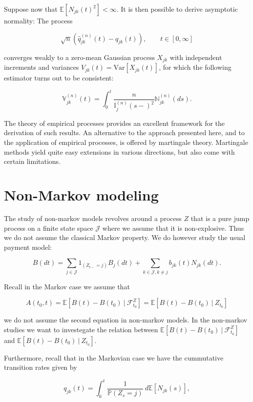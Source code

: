 \documentclass[a4paper,10pt,openany]{book}
\begin{document}
Suppose now that \(\mathbb E[N_{jk}(t)^2] < \infty\). It is then possible to derive asymptotic normality: The process

\[
\sqrt{n}\left(\hat q_{jk}^{(n)}(t)-q_{jk}(t)\right),\qquad t\in [0,\infty]
\]

converges weakly to a zero-mean Gaussian process \(X_{jk}\) with independent increments and variances \(V_{jk}(t) = \text{Var}[X_{jk}(t)]\), for which the following estimator turns out to be consistent:

\[
\mathbb V_{jk}^{(n)}(t)=\int_0^t\frac{n}{\mathbb I_{j}^{(n)}(s-)^2}\mathbb N^{(n)}_{jk}(ds).
\]

The theory of empirical processes provides an excellent framework for the derivation of such results. An alternative to the approach presented here, and to the application of empirical processes, is offered by martingale theory. Martingale methods yield quite easy extensions in various directions, but also come with certain limitations.

\hypertarget{non-markov-modeling}{%
\section{Non-Markov modeling}\label{non-markov-modeling}}

The study of non-markov models revolves around a process \(Z\) that is a pure jump process on a finite state space \(\mathcal J\) where we assume that it is non-explosive. Thus we do not assume the classical Markov property. We do however study the usual payment model:

\[
B(dt)=\sum_{j\in \mathcal J}1_{(Z_{t-}=j)}B_j(dt)+\sum_{k\in\mathcal J,k\ne j} b_{jk}(t)N_{jk}(dt).
\]

Recall in the Markov case we assume that

\[
A(t_0,t)=\mathbb E\left[\left.B(t)-B(t_0)\ \right\vert\ \mathcal F_{t_0}^Z\right]=\mathbb E\left[\left.B(t)-B(t_0)\ \right\vert\ Z_{t_0}\right]
\]

we do not assume the second equation in non-markov models. In the non-markov studies we want to investegate the relation between \(\mathbb E\left[\left.B(t)-B(t_0)\ \right\vert\ \mathcal F_{t_0}^Z\right]\) and \(\mathbb E\left[\left.B(t)-B(t_0)\ \right\vert\ Z_{t_0}\right]\).

Furthermore, recall that in the Markovian case we have the cummutative transition rates given by

\[
q_{jk}(t)=\int_0^t\frac{1}{\mathbb P(Z_s=j)}\ d\mathbb E[N_{jk}(s)],
\]
\end{document}
